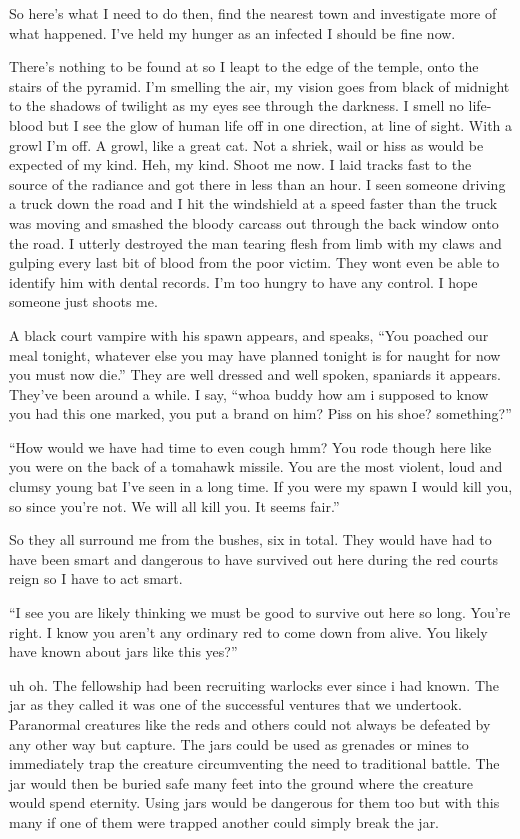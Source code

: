 So here's what I need to do then, find the nearest town and investigate more of what happened. I've held my hunger as an infected I should be fine now.

There's nothing to be found at \chichenitza so I leapt to the edge of the temple, onto the stairs of the pyramid. I'm smelling the air, my vision goes from black of midnight to the shadows of twilight as my eyes see through the darkness. I smell no life-blood but I see the glow of human life off in one direction, at line of sight. With a growl I'm off. A growl, like a great cat. Not a shriek, wail or hiss as would be expected of my kind. Heh, my kind. Shoot me now. I laid tracks fast to the source of the radiance and got there in less than an hour. I seen someone driving a truck down the road and I hit the windshield at a speed faster than the truck was moving and smashed the bloody carcass out through the back window onto the road. I utterly destroyed the man tearing flesh from limb with my claws and gulping every last bit of blood from the poor victim. They wont even be able to identify him with dental records. I'm too hungry to have any control. I hope someone just shoots me.

A black court vampire with his spawn appears, and speaks, ``You poached our meal tonight, whatever else you may have planned tonight is for naught for now you must now die.'' They are well dressed and well spoken, spaniards it appears. They've been around a while.
I say, ``whoa buddy how am i supposed to know you had this one marked, you put a brand on him? Piss on his shoe? something?''

``How would we have had time to even cough hmm? You rode though here like you were on the back of a tomahawk missile. You are the most violent, loud and clumsy young bat I've seen in a long time. If you were my spawn I would kill you, so since you're not. We will all kill you. It seems fair.''

So they all surround me from the bushes, six in total. They would have had to have been smart and dangerous to have survived out here during the red courts reign so I have to act smart.

``I see you are likely thinking we must be good to survive out here so long. You're right. I know you aren't any ordinary red to come down from \chichenitza alive. You likely have known about jars like this yes?''

uh oh. The fellowship had been recruiting warlocks ever since i had known. The jar as they called it was one of the successful ventures that we undertook. Paranormal creatures like the reds and others could not always be defeated by any other way but capture. The jars could be used as grenades or mines to immediately trap the creature circumventing the need to traditional battle. The jar would then be buried safe many feet into the ground where the creature would spend eternity. Using jars would be dangerous for them too but with this many if one of them were trapped another could simply break the jar.

